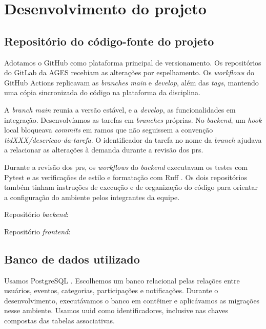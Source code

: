 \section[Desenvolvimento do projeto]{Desenvolvimento do projeto}

\subsection{Repositório do código-fonte do projeto}

Adotamos o GitHub \cite{github-docs} como plataforma principal de
versionamento. Os repositórios do GitLab \cite{gitlab-docs} da AGES recebiam
as alterações por espelhamento. Os \textit{workflows} do GitHub Actions
\cite{github-actions-docs} replicavam as \textit{branches main} e
\textit{develop}, além das \textit{tags}, mantendo uma cópia sincronizada
do código na plataforma da disciplina.

A \textit{branch main} reunia a versão estável, e a \textit{develop}, as
funcionalidades em integração. Desenvolvíamos as tarefas em \textit{branches}
próprias. No \textit{backend}, um \textit{hook} local bloqueava
\textit{commits} em ramos que não seguissem a convenção
\textit{tidXXX/descricao-da-tarefa}. O identificador da tarefa no nome da
\textit{branch} ajudava a relacionar as alterações à demanda durante a revisão
dos \acp{pr}.

Durante a revisão dos \acp{pr}, os \textit{workflows} do \textit{backend}
executavam os testes com Pytest \cite{pytest-docs} e as verificações de
estilo e formatação com Ruff \cite{ruff-docs}. Os dois repositórios
também tinham instruções de execução e de organização do código para orientar
a configuração do ambiente pelos integrantes da equipe.

Repositório \textit{backend}:

{\footnotesize{}}

Repositório \textit{frontend}:

{\footnotesize{}}

\subsection{Banco de dados utilizado}

Usamos PostgreSQL \cite{postgresql-docs}. Escolhemos um banco relacional
pelas relações entre usuários, eventos, categorias, participações e
notificações. Durante o desenvolvimento, executávamos o banco em contêiner
e aplicávamos as migrações nesse ambiente. Usamos \ac{uuid} como
identificadores, inclusive nas chaves compostas das tabelas associativas.

